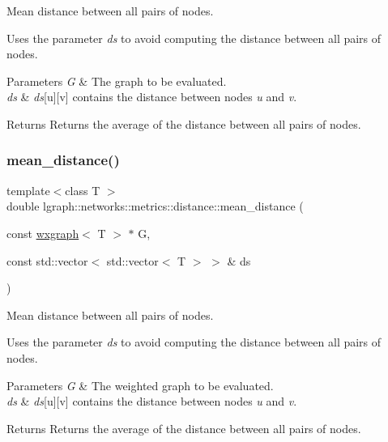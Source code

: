Mean distance between all pairs of nodes. 

Uses the parameter {\itshape ds} to avoid computing the distance between all pairs of nodes.


\begin{DoxyParams}{Parameters}
{\em G} & The graph to be evaluated. \\
\hline
{\em ds} & {\itshape ds}\mbox{[}u\mbox{]}\mbox{[}v\mbox{]} contains the distance between nodes {\itshape u} and {\itshape v}. \\
\hline
\end{DoxyParams}
\begin{DoxyReturn}{Returns}
Returns the average of the distance between all pairs of nodes. 
\end{DoxyReturn}
\mbox{\label{namespacelgraph_1_1networks_1_1metrics_1_1distance_a9fac278edc61e5d86776b7243b6f793a}} 
\subsubsection{\texorpdfstring{mean\+\_\+distance()}{mean\_distance()}\hspace{0.1cm}{\footnotesize\ttfamily [4/4]}}
{\footnotesize\ttfamily template$<$class T $>$ \\
double lgraph\+::networks\+::metrics\+::distance\+::mean\+\_\+distance (\begin{DoxyParamCaption}\item[{const \hyperlink{classlgraph_1_1wxgraph}{wxgraph}$<$ T $>$ $\ast$}]{G,  }\item[{const std\+::vector$<$ std\+::vector$<$ T $>$ $>$ \&}]{ds }\end{DoxyParamCaption})}



Mean distance between all pairs of nodes. 

Uses the parameter {\itshape ds} to avoid computing the distance between all pairs of nodes.


\begin{DoxyParams}{Parameters}
{\em G} & The weighted graph to be evaluated. \\
\hline
{\em ds} & {\itshape ds}\mbox{[}u\mbox{]}\mbox{[}v\mbox{]} contains the distance between nodes {\itshape u} and {\itshape v}. \\
\hline
\end{DoxyParams}
\begin{DoxyReturn}{Returns}
Returns the average of the distance between all pairs of nodes. 
\end{DoxyReturn}
